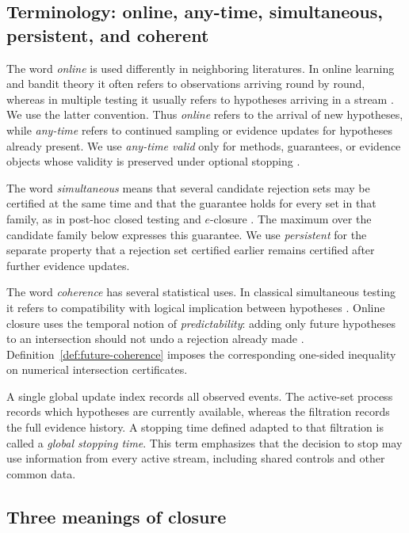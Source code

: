 \documentclass[11pt]{article}
\numberwithin{equation}{section}
\theoremstyle{plain}
\theoremstyle{definition}
\begin{document}
\subsection{Terminology: online, any-time, simultaneous, persistent, and coherent}\label{sec:terminology}

The word \emph{online} is used differently in neighboring literatures. In online learning and bandit theory it often refers to observations arriving round by round, whereas in multiple testing it usually refers to hypotheses arriving in a stream \citep{FosterStine2008,FischerBofillBrannath2024}. We use the latter convention. Thus \emph{online} refers to the arrival of new hypotheses, while \emph{any-time} refers to continued sampling or evidence updates for hypotheses already present. We use \emph{any-time valid} only for methods, guarantees, or evidence objects whose validity is preserved under optional stopping \citep{RamdasWangBook}.

The word \emph{simultaneous} means that several candidate rejection sets may be certified at the same time and that the guarantee holds for every set in that family, as in post-hoc closed testing and $e$-closure \citep{GoemanSolari2011,XuEtAl2026Closure}. The maximum over the candidate family below expresses this guarantee. We use \emph{persistent} for the separate property that a rejection set certified earlier remains certified after further evidence updates.

The word \emph{coherence} has several statistical uses. In classical simultaneous testing it refers to compatibility with logical implication between hypotheses \citep{Gabriel1969}. Online closure uses the temporal notion of \emph{predictability}: adding only future hypotheses to an intersection should not undo a rejection already made \citep{FischerBofillBrannath2024}. Definition~\ref{def:future-coherence} imposes the corresponding one-sided inequality on numerical intersection certificates.

A single global update index records all observed events. The active-set process records which hypotheses are currently available, whereas the filtration records the full evidence history. A stopping time defined adapted to that filtration is called a \emph{global stopping time}. This term emphasizes that the decision to stop may use information from every active stream, including shared controls and other common data.

\subsection{Three meanings of closure}\label{sec:closure-meanings}
\end{document}
